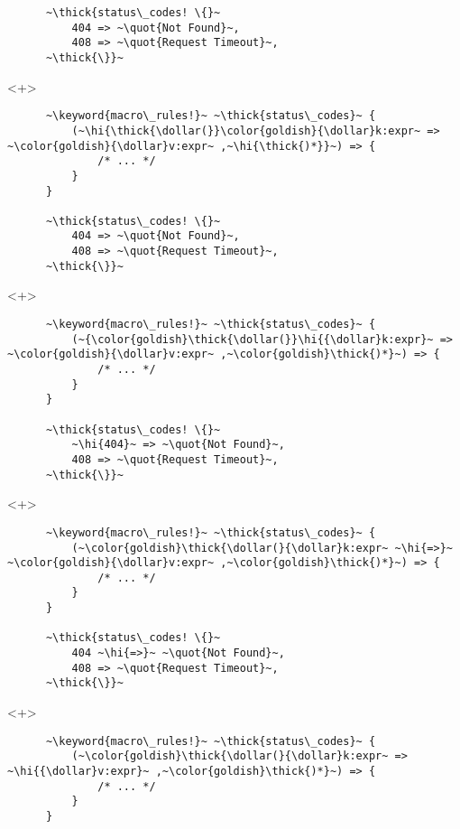 \documentclass[usepdftitle=false]{beamer}
\newcommand{\dollar}{\makebox[\widthof{\$}][c]{\$}}
\newcommand{\thick}[1]{\contourlength{0.16pt}\contour[10]{black}{#1}}
\newcommand{\slantbox}[2][.5]
  {%
    \mbox
      {%
        \sbox{\foobox}{#2}%
        \hskip\wd\foobox
        \pdfsave
        \pdfsetmatrix{1 0 #1 1}%
        \llap{\usebox{\foobox}}%
        \pdfrestore
      }%
  }
\newcommand{\backslantbox}[2][.5]
  {%
    \mbox
      {%
        \sbox{\foobox}{#2}%
        \hskip\wd\foobox
        \pdfsave
        \pdfsetmatrix{-1 0 #1 1}%
        \llap{\usebox{\foobox}}%
        \pdfrestore
      }%
  }
\newcommand{\hi}[1]{%
\tikz[baseline=(A.base)]
 \node[highlighting=yellowbg,inner sep=0pt,text depth=0pt] (A) {#1};%
}
\newcommand{\openquote}{\backslantbox[.2]{\hspace{11pt}''\hspace{-11pt}}}
\newcommand{\closequote}{\slantbox[-.2]{\hspace{2pt}''\hspace{-2pt}}}
\newcommand{\blackquote}[1]{\openquote#1\closequote}
\newcommand{\quot}[1]{{\color{redish}\blackquote{#1}}}
\newcommand{\keyword}[1]{\color{greenish}#1}
\begin{document}
\begin{frame}[fragile]
\begin{onlyenv}
\begin{verbatim}
      ~\thick{status\_codes! \{}~
          404 => ~\quot{Not Found}~,
          408 => ~\quot{Request Timeout}~,
      ~\thick{\}}~
    \end{verbatim}
  \end{onlyenv}
  \begin{onlyenv}<+>
    \begin{verbatim}
      ~\keyword{macro\_rules!}~ ~\thick{status\_codes}~ {
          (~\hi{\thick{\dollar(}}\color{goldish}{\dollar}k:expr~ => ~\color{goldish}{\dollar}v:expr~ ,~\hi{\thick{)*}}~) => {
              /* ... */
          }
      }

      ~\thick{status\_codes! \{}~
          404 => ~\quot{Not Found}~,
          408 => ~\quot{Request Timeout}~,
      ~\thick{\}}~
    \end{verbatim}
  \end{onlyenv}
  \begin{onlyenv}<+>
    \begin{verbatim}
      ~\keyword{macro\_rules!}~ ~\thick{status\_codes}~ {
          (~{\color{goldish}\thick{\dollar(}}\hi{{\dollar}k:expr}~ => ~\color{goldish}{\dollar}v:expr~ ,~\color{goldish}\thick{)*}~) => {
              /* ... */
          }
      }

      ~\thick{status\_codes! \{}~
          ~\hi{404}~ => ~\quot{Not Found}~,
          408 => ~\quot{Request Timeout}~,
      ~\thick{\}}~
    \end{verbatim}
  \end{onlyenv}
  \begin{onlyenv}<+>
    \begin{verbatim}
      ~\keyword{macro\_rules!}~ ~\thick{status\_codes}~ {
          (~\color{goldish}\thick{\dollar(}{\dollar}k:expr~ ~\hi{=>}~ ~\color{goldish}{\dollar}v:expr~ ,~\color{goldish}\thick{)*}~) => {
              /* ... */
          }
      }

      ~\thick{status\_codes! \{}~
          404 ~\hi{=>}~ ~\quot{Not Found}~,
          408 => ~\quot{Request Timeout}~,
      ~\thick{\}}~
    \end{verbatim}
  \end{onlyenv}
  \begin{onlyenv}<+>
    \begin{verbatim}
      ~\keyword{macro\_rules!}~ ~\thick{status\_codes}~ {
          (~\color{goldish}\thick{\dollar(}{\dollar}k:expr~ => ~\hi{{\dollar}v:expr}~ ,~\color{goldish}\thick{)*}~) => {
              /* ... */
          }
      }


\end{verbatim}
\end{onlyenv}
\end{frame}
\end{document}
